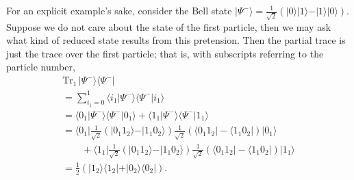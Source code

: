 {%
\label{bellstate}
For an explicit example's sake, consider the Bell state  
$\vert \Psi^- \rangle= \frac{1}{\sqrt{2}}\left(\vert 0 \rangle \vert 1 \rangle - \vert 1 \rangle \vert 0 \rangle  \right)$.
Suppose we do not care about the state of the first particle, then we may ask what kind of reduced state results from this
pretension.
Then the partial trace is just the trace over the first particle; that is, with subscripts referring to the particle number,
\begin{equation}
\begin{split}
\textrm{Tr}_1\, \vert \Psi^- \rangle \langle  \Psi^-   \vert  \\
=\sum_{i_1=0}^1 \langle i_1 \vert \Psi^- \rangle \langle  \Psi^-  \vert i_1 \rangle \\
=\langle 0_1 \vert \Psi^- \rangle \langle  \Psi^-  \vert 0_1 \rangle
+
\langle 1_1  \vert \Psi^- \rangle \langle  \Psi^-  \vert 1_1 \rangle  \\
=\langle 0_1 \vert  \frac{1}{\sqrt{2}}\left(\vert 0_1   1_2 \rangle - \vert 1_1   0_2 \rangle  \right)  \frac{1}{\sqrt{2}}\left(\langle 0_1   1_2 \vert  - \langle 1_1   0_2 \vert   \right)  \vert 0_1 \rangle\\
\qquad
+
\langle 1_1 \vert  \frac{1}{\sqrt{2}}\left(\vert 0_1   1_2 \rangle - \vert 1_1   0_2 \rangle  \right)  \frac{1}{\sqrt{2}}\left(\langle 0_1   1_2 \vert  - \langle 1_1   0_2 \vert   \right)  \vert 1_1 \rangle  \\
= \frac{1}{2}
\left(
\vert 1_2 \rangle \langle   1_2 \vert
+
\vert 0_2 \rangle \langle   0_2 \vert
\right)
.
\end{split}
\end{equation}

}
